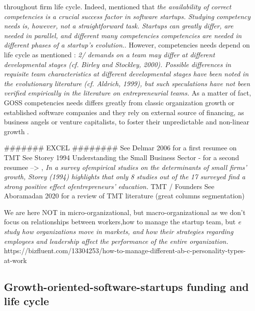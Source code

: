 throughout firm life cycle. Indeed, \citet{seppanen2016initial} mentioned that \textit{the availability of correct competencies is a crucial success factor in software startups. Studying competency needs is, however, not a straightforward task. Startups can greatly differ, are needed in parallel, and different many competencies competencies are needed in different phases of a startup's evolution.}.
However, competencies needs depend on life cycle as \citet{chandler2005antecedents} mentioned : \textit{2/ demands on a team may differ at different developmental stages (cf. Birley and Stockley, 2000). Possible differences in requisite team characteristics at different developmental stages have been noted in the evolutionary literature (cf. Aldrich, 1999), but such speculations have not been verified empirically in the literature on entrepreneurial teams.}
As a matter of fact, GOSS competencies needs differs greatly from classic organization growth or established software companies and they rely on external source of financing, as business angels or venture capitalists, to foster their unpredictable and non-linear growth \citep{unterkalmsteiner2016software, huang2017growing, nambisan2017digital, cavallo2019fostering}.


####### EXCEL ########
See Delmar 2006 for a first resumee on TMT
See Storey 1994 Understanding the Small Business Sector - for a second resumee --> \citet{colombo2005founders}, \textit{In a survey ofempirical studies on the determinants of small firms’ growth, Storey (1994) highlights that only 8 studies out of the 17 surveyed find a strong positive effect ofentrepreneurs’ education.} TMT / Founders
See Aboramadan 2020 for a review of TMT literature (great columns segmentation)

We are here NOT in micro-organizational, but macro-organizational as we don't focus on relationships between workers,how to manage the startup team, but  \textit{e study how organizations move in markets, and how their strategies regarding employees and leadership affect the performance of the entire organization.}
https://bizfluent.com/13304253/how-to-manage-different-ab-c-personality-types-at-work

\subsection{Growth-oriented-software-startups funding and life cycle }

